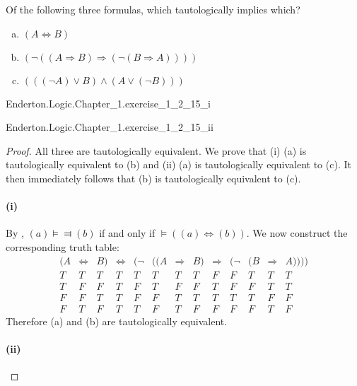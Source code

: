 \documentclass{report}
\begin{document}
  Of the following three formulas, which tautologically implies which?
    \begin{enumerate}[(a)]
      \item $(A \Leftrightarrow B)$
      \item $(\neg((A \Rightarrow B) \Rightarrow (\neg(B \Rightarrow A))))$
      \item $(((\neg A) \lor B) \land (A \lor (\neg B)))$
    \end{enumerate}

    {Enderton.Logic.Chapter\_1.exercise\_1\_2\_15\_i}

    {Enderton.Logic.Chapter\_1.exercise\_1\_2\_15\_ii}

  \begin{proof}

    All three are tautologically equivalent.
    We prove that (i) (a) is tautologically equivalent to (b) and (ii) (a) is
      tautologically equivalent to (c). It then immediately follows that (b) is
      tautologically equivalent to (c).

    \paragraph{(i)}%

      By , $(a) \vDash\Dashv (b)$ if and only if
        $\vDash ((a) \Leftrightarrow (b))$.
      We now construct the corresponding truth table:
        $$\begin{array}{s|c|s|e|c|s|c|s|c|c|s|c|s}
          (A & \Leftrightarrow & B) & \Leftrightarrow &
            (\neg & ((A & \Rightarrow & B) &
              \Rightarrow & (\neg & (B & \Rightarrow & A)))) \\
          \hline
          T & T & T & T & T & T & T & T & F & F & T & T & T \\
          T & F & F & T & F & T & F & F & T & F & F & T & T \\
          F & F & T & T & F & F & T & T & T & T & T & F & F \\
          F & T & F & T & T & F & T & F & F & F & F & T & F
        \end{array}$$
      Therefore (a) and (b) are tautologically equivalent.

    \paragraph{(ii)}%


\end{proof}
\end{document}
